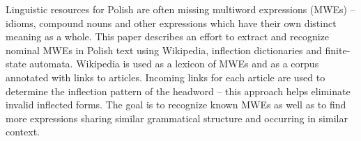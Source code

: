 Linguistic resources for Polish are often missing multiword expressions (MWEs) -- idioms, compound nouns and other expressions which have their own distinct meaning as a whole. This paper describes an effort to extract and recognize nominal MWEs in Polish text using Wikipedia, inflection dictionaries and finite-state automata. Wikipedia is used as a lexicon of MWEs and as a corpus annotated with links to articles. Incoming links for each article are used to determine the inflection pattern of the headword -- this approach helps eliminate invalid inflected forms. The goal is to recognize known MWEs as well as to find more expressions sharing similar grammatical structure and occurring in similar context.
